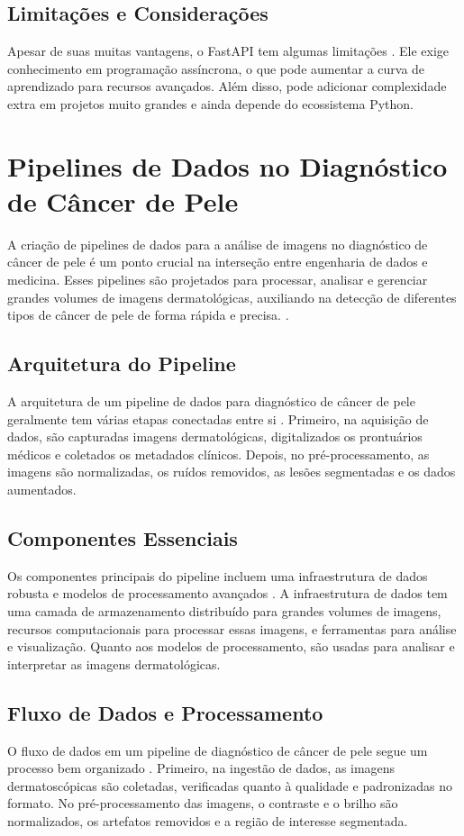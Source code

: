 \subsection{Limitações e Considerações}
Apesar de suas muitas vantagens, o FastAPI tem algumas limitações \cite{kumar2023modern}. Ele exige conhecimento em programação assíncrona, o que pode aumentar a curva de aprendizado para recursos avançados. Além disso, pode adicionar complexidade extra em projetos muito grandes e ainda depende do ecossistema Python.


\section{Pipelines de Dados no Diagnóstico de Câncer de Pele}
A criação de pipelines de dados para a análise de imagens no diagnóstico de câncer de pele é um ponto crucial na interseção entre engenharia de dados e medicina. Esses pipelines são projetados para processar, analisar e gerenciar grandes volumes de imagens dermatológicas, auxiliando na detecção de diferentes tipos de câncer de pele de forma rápida e precisa. \cite{zhang2021deep}.
\subsection{Arquitetura do Pipeline}
A arquitetura de um pipeline de dados para diagnóstico de câncer de pele geralmente tem várias etapas conectadas entre si \cite{esteva2022deep}. Primeiro, na aquisição de dados, são capturadas imagens dermatológicas, digitalizados os prontuários médicos e coletados os metadados clínicos. Depois, no pré-processamento, as imagens são normalizadas, os ruídos removidos, as lesões segmentadas e os dados aumentados.
\subsection{Componentes Essenciais}
Os componentes principais do pipeline incluem uma infraestrutura de dados robusta e modelos de processamento avançados \cite{kumar2023medical}. A infraestrutura de dados tem uma camada de armazenamento distribuído para grandes volumes de imagens, recursos computacionais para processar essas imagens, e ferramentas para análise e visualização. Quanto aos modelos de processamento, são usadas para analisar e interpretar as imagens dermatológicas.
\subsection{Fluxo de Dados e Processamento}
O fluxo de dados em um pipeline de diagnóstico de câncer de pele segue um processo bem organizado \cite{wang2023automated}. Primeiro, na ingestão de dados, as imagens dermatoscópicas são coletadas, verificadas quanto à qualidade e padronizadas no formato. No pré-processamento das imagens, o contraste e o brilho são normalizados, os artefatos removidos e a região de interesse segmentada.
